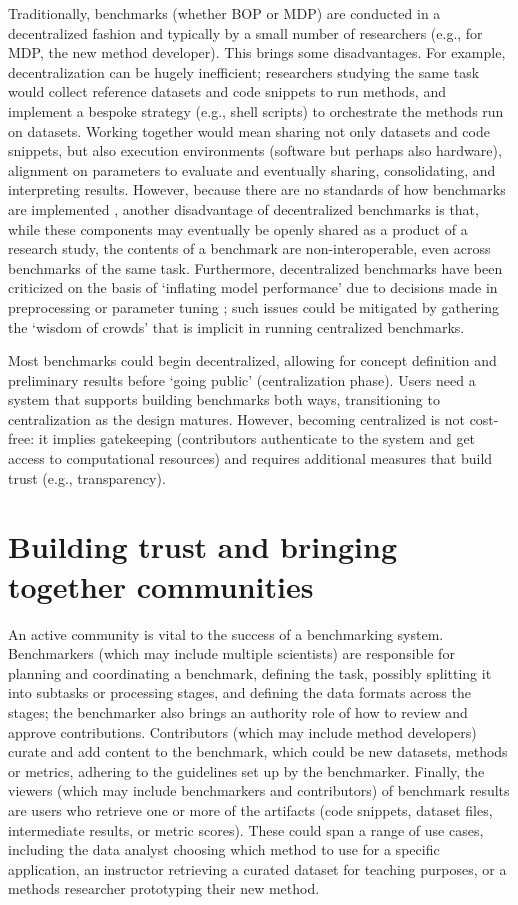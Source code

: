 \documentclass[11pt]{article}
\begin{document}
Traditionally, benchmarks (whether BOP or MDP) are conducted in a decentralized fashion and typically by a small number of researchers (e.g., for MDP, the new method developer). This brings some disadvantages. For example, decentralization can be hugely inefficient; researchers studying the same task would collect reference datasets and code snippets to run methods, and implement a bespoke strategy (e.g., shell scripts) to orchestrate the methods run on datasets. Working together would mean sharing not only datasets and code snippets, but also execution environments (software but perhaps also hardware), alignment on parameters to evaluate and eventually sharing, consolidating, and interpreting results. However, because there are no standards of how benchmarks are implemented \cite{Sonrel2023-te}, another disadvantage of decentralized benchmarks is that, while these components may eventually be openly shared as a product of a research study, the contents of a benchmark are non-interoperable, even across benchmarks of the same task. Furthermore, decentralized benchmarks have been criticized on the basis of `inflating model performance' due to decisions made in preprocessing or parameter tuning \cite{Luecken2024-fk}; such issues could be mitigated by gathering the `wisdom of crowds' that is implicit in running centralized benchmarks.

Most benchmarks could begin decentralized, allowing for concept definition and preliminary results before `going public' (centralization phase). Users need a system that supports building benchmarks both ways, transitioning to centralization as the design matures. However, becoming centralized is not cost-free: it implies gatekeeping (contributors authenticate to the system and get access to computational resources) and requires additional measures that build trust (e.g., transparency).

\section*{Building trust and bringing together communities}

An active community is vital to the success of a benchmarking system. Benchmarkers (which may include multiple scientists) are responsible for planning and coordinating a benchmark, defining the task, possibly splitting it into subtasks or processing stages, and defining the data formats across the stages; the benchmarker also brings an authority role of how to review and approve contributions. Contributors (which may include method developers) curate and add content to the benchmark, which could be new datasets, methods or metrics, adhering to the guidelines set up by the benchmarker. Finally, the viewers (which may include benchmarkers and contributors) of benchmark results are users who retrieve one or more of the artifacts (code snippets, dataset files, intermediate results, or metric scores). These could span a range of use cases, including the data analyst choosing which method to use for a specific application, an instructor retrieving a curated dataset for teaching purposes, or a methods researcher prototyping their new method.
\end{document}
